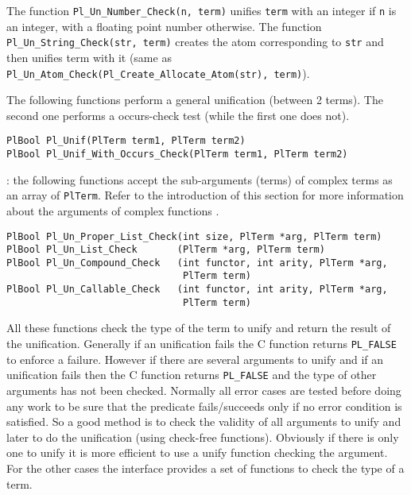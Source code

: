 The function \texttt{Pl\_Un\_Number\_Check(n, term)} unifies \texttt{term} with
an integer if \texttt{n} is an integer, with a floating point number
otherwise. The function \texttt{Pl\_Un\_String\_Check(str, term)} creates the
atom corresponding to \texttt{str} and then unifies term with it (same as
\texttt{Pl\_Un\_Atom\_Check(Pl\_Create\_Allocate\_Atom(str), term)}).

The following functions perform a general unification (between 2 terms). The
second one performs a occurs-check test (while the first one does not).

\begin{Indentation}
\begin{verbatim}
PlBool Pl_Unif(PlTerm term1, PlTerm term2)
PlBool Pl_Unif_With_Occurs_Check(PlTerm term1, PlTerm term2)
\end{verbatim}
\end{Indentation}

: the following functions accept the sub-arguments
(terms) of complex terms as an array of \texttt{PlTerm}. Refer to the
introduction of this section for more information about the arguments of
complex functions .

\begin{Indentation}
\begin{verbatim}
PlBool Pl_Un_Proper_List_Check(int size, PlTerm *arg, PlTerm term)
PlBool Pl_Un_List_Check       (PlTerm *arg, PlTerm term)
PlBool Pl_Un_Compound_Check   (int functor, int arity, PlTerm *arg,
                               PlTerm term)
PlBool Pl_Un_Callable_Check   (int functor, int arity, PlTerm *arg,
                               PlTerm term)
\end{verbatim}
\end{Indentation}

All these functions check the type of the term to unify and return the
result of the unification. Generally if an unification fails the C function
returns \texttt{PL\_FALSE} to enforce a failure. However if there are several
arguments to unify and if an unification fails then the C function returns
\texttt{PL\_FALSE} and the type of other arguments has not been checked.
Normally all error cases are tested before doing any work to be sure that
the predicate fails/succeeds only if no error condition is satisfied. So a
good method is to check the validity of all arguments to unify and later
to do the unification (using check-free functions). Obviously if there is
only one to unify it is more efficient to use a unify function checking the
argument. For the other cases the interface provides a set of functions to
check the type of a term.

